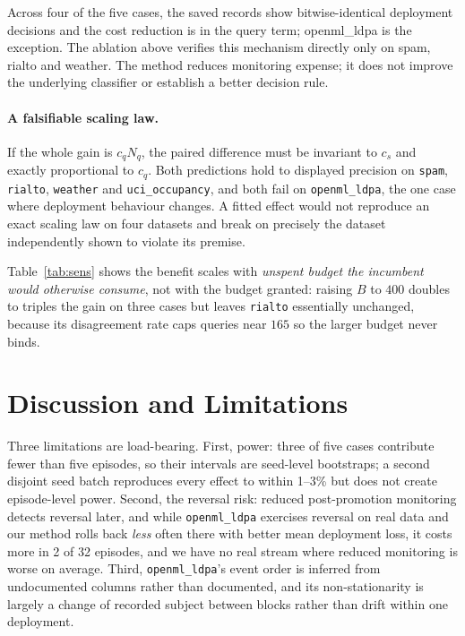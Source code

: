 \documentclass{article}
\begin{document}
Across four of the five cases, the saved records show bitwise-identical deployment decisions and
the cost reduction is in the query term; openml\_ldpa is the exception. The ablation above verifies
this mechanism directly only on spam, rialto and weather. The method reduces monitoring expense;
it does not improve the underlying classifier or establish a better decision rule.

\paragraph{A falsifiable scaling law.} If the whole gain is $c_qN_q$, the paired difference must be
invariant to $c_s$ and exactly proportional to $c_q$. Both predictions hold to displayed precision
on \texttt{spam}, \texttt{rialto}, \texttt{weather} and \texttt{uci\_occupancy}, and both fail on
\texttt{openml\_ldpa}, the one case where deployment behaviour changes. A fitted effect would not
reproduce an exact scaling law on four datasets and break on precisely the dataset independently
shown to violate its premise.

\begin{table}[t]\centering\footnotesize

\caption{Paired difference by configuration. Dashes mark configurations not run rather than
interpolated values.}
\label{tab:sens}
\end{table}

Table~\ref{tab:sens} shows the benefit scales with \emph{unspent budget the incumbent would
otherwise consume}, not with the budget granted: raising $B$ to $400$ doubles to triples the gain
on three cases but leaves \texttt{rialto} essentially unchanged, because its disagreement rate
caps queries near $165$ so the larger budget never binds.

\section{Discussion and Limitations}
Three limitations are load-bearing. First, power: three of five cases contribute fewer than five
episodes, so their intervals are seed-level bootstraps; a second disjoint seed batch reproduces
every effect to within 1--3\% but does not create episode-level power. Second, the reversal risk:
reduced post-promotion monitoring detects reversal later, and while \texttt{openml\_ldpa} exercises
reversal on real data and our method rolls back \emph{less} often there with better mean deployment
loss, it costs more in 2 of 32 episodes, and we have no real stream where reduced monitoring is
worse on average. Third, \texttt{openml\_ldpa}'s event order is inferred from undocumented columns
rather than documented, and its non-stationarity is largely a change of recorded subject between
blocks rather than drift within one deployment.
\end{document}
